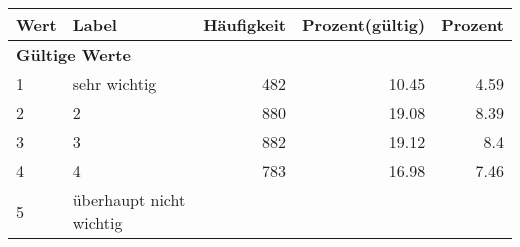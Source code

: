      \begin{longtable}{lXrrr}
     \toprule
     \textbf{Wert} & \textbf{Label} & \textbf{Häufigkeit} & \textbf{Prozent(gültig)} & \textbf{Prozent} \\
     \endhead
     \midrule
     \multicolumn{5}{l}{\textbf{Gültige Werte}}\\

     1 &
     \multicolumn{1}{X}{ sehr wichtig   } &


       \num{482} &
       \num[round-mode=places,round-precision=2]{10.45} &
         \num[round-mode=places,round-precision=2]{4.59} \\

     2 &
     \multicolumn{1}{X}{ 2   } &


       \num{880} &
       \num[round-mode=places,round-precision=2]{19.08} &
         \num[round-mode=places,round-precision=2]{8.39} \\

     3 &
     \multicolumn{1}{X}{ 3   } &


       \num{882} &
       \num[round-mode=places,round-precision=2]{19.12} &
         \num[round-mode=places,round-precision=2]{8.4} \\

     4 &
     \multicolumn{1}{X}{ 4   } &


       \num{783} &
       \num[round-mode=places,round-precision=2]{16.98} &
         \num[round-mode=places,round-precision=2]{7.46} \\

     5 &
     \multicolumn{1}{X}{ überhaupt nicht wichtig   } &



\end{longtable}
